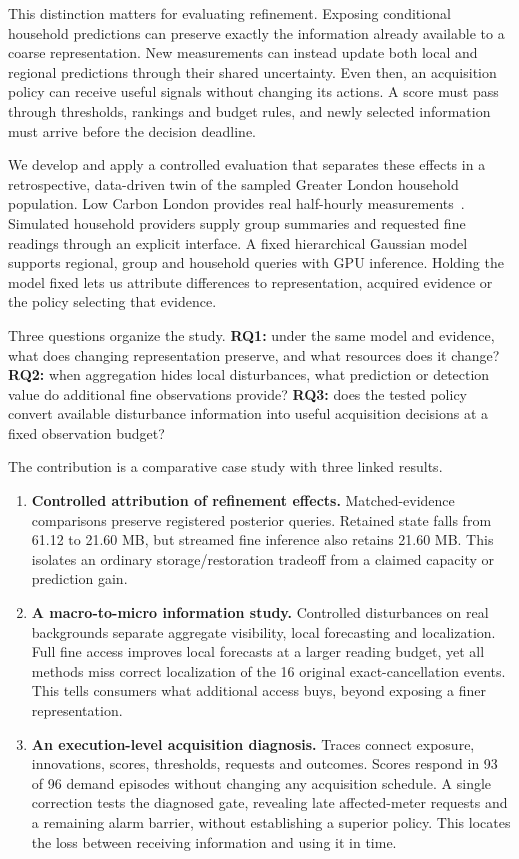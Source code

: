 \documentclass[conference]{IEEEtran}
\begin{document}
This distinction matters for evaluating refinement. Exposing conditional household predictions can preserve exactly the information already available to a coarse representation. New measurements can instead update both local and regional predictions through their shared uncertainty. Even then, an acquisition policy can receive useful signals without changing its actions. A score must pass through thresholds, rankings and budget rules, and newly selected information must arrive before the decision deadline.

We develop and apply a controlled evaluation that separates these effects in a retrospective, data-driven twin of the sampled Greater London household population. Low Carbon London provides real half-hourly measurements~\cite{london}. Simulated household providers supply group summaries and requested fine readings through an explicit interface. A fixed hierarchical Gaussian model supports regional, group and household queries with GPU inference. Holding the model fixed lets us attribute differences to representation, acquired evidence or the policy selecting that evidence.

Three questions organize the study. \textbf{RQ1:} under the same model and evidence, what does changing representation preserve, and what resources does it change? \textbf{RQ2:} when aggregation hides local disturbances, what prediction or detection value do additional fine observations provide? \textbf{RQ3:} does the tested policy convert available disturbance information into useful acquisition decisions at a fixed observation budget?

The contribution is a comparative case study with three linked results.
\begin{enumerate}
\item \textbf{Controlled attribution of refinement effects.} Matched-evidence comparisons preserve registered posterior queries. Retained state falls from 61.12 to 21.60 MB, but streamed fine inference also retains 21.60 MB. This isolates an ordinary storage/restoration tradeoff from a claimed capacity or prediction gain.
\item \textbf{A macro-to-micro information study.} Controlled disturbances on real backgrounds separate aggregate visibility, local forecasting and localization. Full fine access improves local forecasts at a larger reading budget, yet all methods miss correct localization of the 16 original exact-cancellation events. This tells consumers what additional access buys, beyond exposing a finer representation.
\item \textbf{An execution-level acquisition diagnosis.} Traces connect exposure, innovations, scores, thresholds, requests and outcomes. Scores respond in 93 of 96 demand episodes without changing any acquisition schedule. A single correction tests the diagnosed gate, revealing late affected-meter requests and a remaining alarm barrier, without establishing a superior policy. This locates the loss between receiving information and using it in time.
\end{enumerate}
\end{document}
